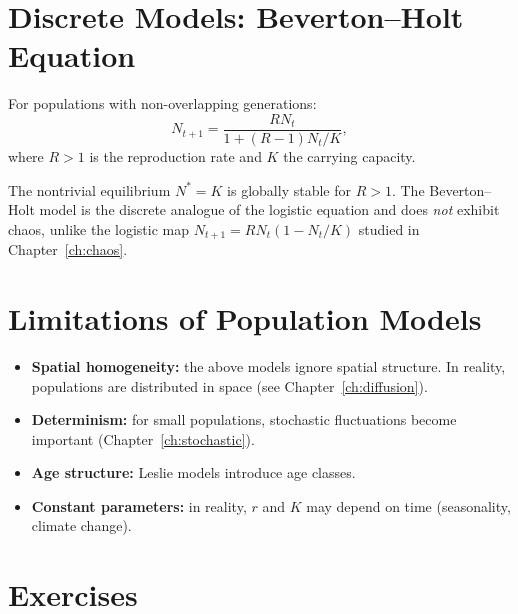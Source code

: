\section{Discrete Models: Beverton--Holt Equation}

\begin{definition}
For populations with non-overlapping generations:
\[
  N_{t+1} = \frac{RN_t}{1 + (R-1)N_t/K},
\]
where $R>1$ is the reproduction rate and $K$ the carrying capacity.
\end{definition}

\begin{proposition}
The nontrivial equilibrium $N^*=K$ is globally stable for $R>1$.
The Beverton--Holt model is the discrete analogue of the logistic
equation and does \emph{not} exhibit chaos, unlike the logistic map
$N_{t+1}=RN_t(1-N_t/K)$ studied in Chapter~\ref{ch:chaos}.
\end{proposition}

\section{Limitations of Population Models}

\begin{warning}[title=\textbf{Assumptions and limitations}]
\begin{itemize}
  \item \textbf{Spatial homogeneity:} the above models ignore spatial
    structure.  In reality, populations are distributed in space
    (see Chapter~\ref{ch:diffusion}).
  \item \textbf{Determinism:} for small populations, stochastic
    fluctuations become important (Chapter~\ref{ch:stochastic}).
  \item \textbf{Age structure:} Leslie models introduce age classes.
  \item \textbf{Constant parameters:} in reality, $r$ and $K$ may
    depend on time (seasonality, climate change).
\end{itemize}
\end{warning}

\section{Exercises}

